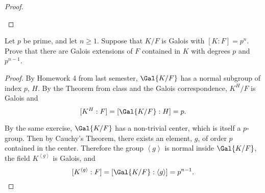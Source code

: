 \documentclass[10pt]{amsart}
\begin{document}
\begin{thm}
\begin{proof}
\begin{enumerate}[(a)]
\begin{center}
      \end{center}
    \end{enumerate}
  \end{proof}
\end{thm}

\begin{thm}
  Let $p$ be prime, and let $n \geq 1$.
  Suppose that $K/F$ is Galois with $[K : F] = p^n$.
  Prove that there are Galois extensions of $F$ contained in $K$ with degrees $p$ and $p^{n-1}$.
  
  \begin{proof}
    By Homework 4 from last semester, $\Gal{K/F}$ has a normal subgroup of index $p$, $H$.
    By the Theorem from class and the Galois correspondence, $K^H/F$ is Galois and
    $$[K^H : F] = [\Gal{K/F} : H] = p.$$
    
    By the same exercise, $\Gal{K/F}$ has a non-trivial center, which is itself a $p$-group.
    Then by Cauchy's Theorem, there exists an element, $g$, of order $p$ contained in the center.
    Therefore the group $\left<g\right>$ is normal inside $\Gal{K/F}$, the field $K^{\left<g\right>}$ is Galois, and
    $$[K^{\left<g\right>} : F] = [\Gal{K/F} : \left<g\right>] = p^{n-1}.$$
  \end{proof}
\end{thm}
\end{document}

